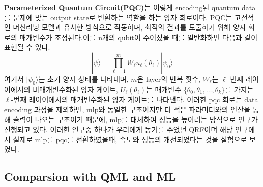 \textbf{Parameterized Quantum Circuit(PQC)}는 이렇게 encoding된 quantum data를 문제에 맞는 output state로 변환하는 역할을 하는 양자 회로이다. PQC는 고전적인 머신러닝 모델과 유사한 방식으로 작동하며, 최적의 결과를 도출하기 위해 양자 회로의 매개변수가 조정된다.이를 n개의 qubit이 주어졌을 때를 일반화하면 다음과 같이 표현될 수 있다.
\[
|\psi\rangle = \prod_{\ell=1}^{m} W_{\ell} u_{\ell}(\theta_{\ell}) |\psi_0\rangle
\]
여기서 \( |\psi_0\rangle \)는 초기 양자 상태를 나타내며, \( m \)은 layer의 반복 횟수, \( W_{\ell} \)는 \(\ell\)-번째 레이어에서의 비매개변수화된 양자 게이트, \( U_{\ell}(\theta_{\ell}) \)는 매개변수 \(\{\theta_0, \theta_1, \ldots, \theta_k\}\)를 가지는 \(\ell\)-번째 레이어에서의 매개변수화된 양자 게이트를 나타낸다. 이러한 pqc 회로는 data encoding 과정을 제외하면, mlp와 동일한 구조이지만 더 적은 파라미터와의 연산을 통해 출력이 나오는 구조이기 때문에, mlp를 대체하여 성능을 높이려는 방식으로 연구가 진행되고 있다. 이러한 연구중 하나가 우리에게 동기를 주었던 QRF이며 해당 연구에서 실제로 mlp를 pqc를 전환하였을때, 속도와 성능의 개선되었다는 것을 실험으로 보였다.\cite{yang2022quantum}

%
%
\subsection{Comparsion with QML and ML} \label{qml:comparision}

